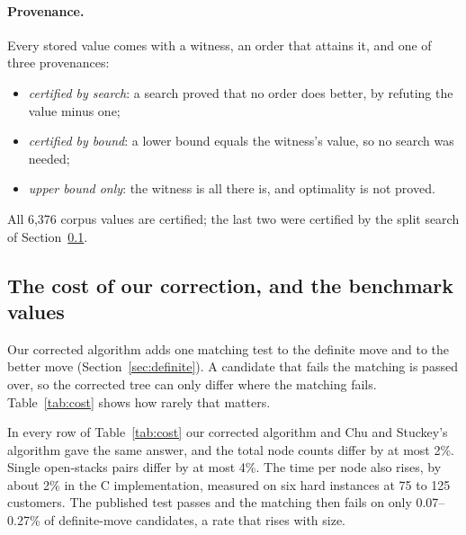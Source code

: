 \paragraph{Provenance.} Every stored value comes with a witness, an order that
attains it, and one of three provenances:
\begin{itemize}
\item \emph{certified by search}: a search proved that no order does better,
  by refuting the value minus one;
\item \emph{certified by bound}: a lower bound equals the witness's value, so
  no search was needed;
\item \emph{upper bound only}: the witness is all there is, and optimality is
  not proved.
\end{itemize}
All 6,376 corpus values are certified; the last two were certified by the
split search of Section~\ref{sec:practice}.

\subsection{The cost of our correction, and the benchmark values}
\label{sec:practice}

Our corrected algorithm adds one matching test to the definite move and to the
better move (Section~\ref{sec:definite}). A candidate that fails the matching
is passed over, so the corrected tree can only differ where the matching fails.
Table~\ref{tab:cost} shows how rarely that matters.

\begin{table}[t]
\centering\small
\caption{Our correction never changed an answer and costs at most 2\% more
nodes in total. Each pair runs the same question under Chu and Stuckey's algorithm and under the
corrected rules in one worker. Totals are over the pairs that finished under
both rules; a pair stopped by its budget says nothing about cost.
\emph{Vertices}: customers in the open-stacks rows (the vertices of $G_M$).
\emph{Largest pair ratio}: the largest ratio of corrected to previous nodes
over single pairs. Open-stacks pairs refute the optimum minus one, at 600\,s per
call at 50--100 customers and $2\times10^8$ nodes at 125. The graph pairs run
whole descents on VSPLIB, the colouring and named graphs, and a sample of 500
Rome graphs.}
\label{tab:cost}
\resizebox{\linewidth}{!}{}
\end{table}

In every row of Table~\ref{tab:cost} our corrected algorithm and Chu and Stuckey's algorithm gave
the same answer, and the total node counts differ by at most 2\%. Single
open-stacks pairs differ by at most 4\%. The time per node also rises, by about 2\% in the C
implementation, measured on six hard instances at 75 to 125 customers. The
published test passes and the matching then fails on only 0.07--0.27\% of
definite-move candidates, a rate that rises with size.

